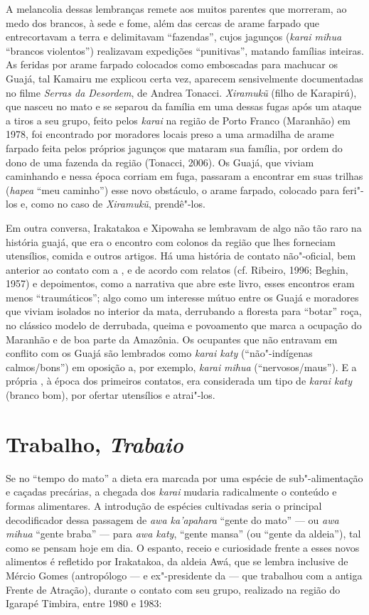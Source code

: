 A melancolia dessas lembranças remete aos muitos parentes que morreram,
ao medo dos brancos, à sede e fome, além das cercas de arame farpado que
entrecortavam a terra e delimitavam ``fazendas'', cujos jagunços
(\emph{karai mihua} ``brancos violentos'') realizavam expedições
``punitivas'', matando famílias inteiras. As feridas por arame farpado
colocados como emboscadas para machucar os Guajá, tal Kamairu me
explicou certa vez, aparecem sensivelmente documentadas no filme
\emph{Serras da Desordem}, de Andrea Tonacci. \emph{Xiramukũ} (filho de
Karapirú), que nasceu no mato e se separou da família em uma dessas
fugas após um ataque a tiros a seu grupo, feito pelos \emph{karai} na
região de Porto Franco (Maranhão) em 1978, foi encontrado por moradores
locais preso a uma armadilha de arame farpado feita pelos próprios
jagunços que mataram sua família, por ordem do dono de uma fazenda da
região (Tonacci, 2006). Os Guajá, que viviam caminhando e nessa época
corriam em fuga, passaram a encontrar em suas trilhas (\emph{hapea}
``meu caminho'') esse novo obstáculo, o arame farpado, colocado para
feri"-los e, como no caso de \emph{Xiramukũ}, prendê"-los.

Em outra conversa, Irakatakoa e Xipowaha se lembravam de algo não tão
raro na história guajá, que era o encontro com colonos da região que
lhes forneciam utensílios, comida e outros artigos. Há uma história de
contato não"-oficial, bem anterior ao contato com a , e de acordo
com relatos (cf. Ribeiro, 1996; Beghin, 1957) e depoimentos, como a
narrativa que abre este livro, esses encontros eram menos ``traumáticos'';
algo como um interesse mútuo entre os Guajá e moradores que viviam
isolados no interior da mata, derrubando a floresta para ``botar'' roça,
no clássico modelo de derrubada, queima e povoamento que marca a
ocupação do Maranhão e de boa parte da Amazônia. Os ocupantes que não
entravam em conflito com os Guajá são lembrados como \emph{karai katy}
(``não"-indígenas calmos/bons'') em oposição a, por exemplo, \emph{karai}
\emph{mihua} (``nervosos/maus''). E a própria , à época dos
primeiros contatos, era considerada um tipo de \emph{karai katy} (branco
bom), por ofertar utensílios e atrai"-los.

\section{Trabalho, \emph{Trabaio}}

Se no ``tempo do mato'' a dieta era marcada por uma espécie de
sub"-alimentação e caçadas precárias, a chegada dos \emph{karai} mudaria
radicalmente o conteúdo e formas alimentares. A introdução de espécies
cultivadas seria o principal decodificador dessa passagem de \emph{awa
ka'apahara} ``gente do mato'' --- ou \emph{awa mihua} ``gente braba'' ---
para \emph{awa katy}, ``gente mansa'' (ou ``gente da aldeia''), tal como
se pensam hoje em dia. O espanto, receio e curiosidade frente a esses
novos alimentos é refletido por Irakatakoa, da aldeia Awá, que se
lembra inclusive de Mércio Gomes (antropólogo --- e ex"-presidente da 
--- que trabalhou com a antiga Frente de Atração), durante o contato com
seu grupo, realizado na região do Igarapé Timbira, entre 1980 e 1983:

